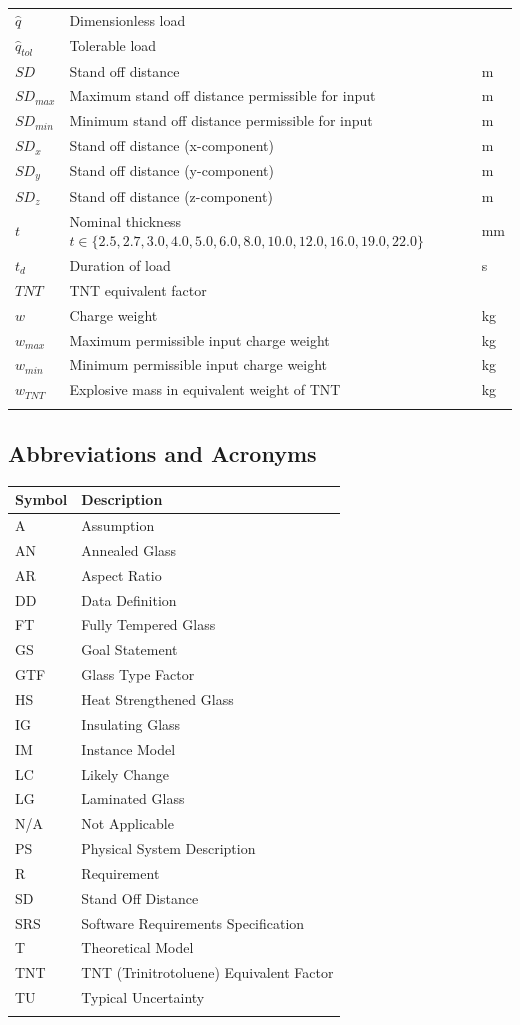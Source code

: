 \documentclass[12pt]{article}
\begin{document}
\begin{longtabu}{l X[l] l}
\\
$\hat{q}$ & Dimensionless load & 
\\
${\hat{q}_{tol}}$ & Tolerable load & 
\\
$SD$ & Stand off distance & m
\\
${SD_{max}}$ & Maximum stand off distance permissible for input & m
\\
${SD_{min}}$ & Minimum stand off distance permissible for input & m
\\
${SD_{x}}$ & Stand off distance (x-component) & m
\\
${SD_{y}}$ & Stand off distance (y-component) & m
\\
${SD_{z}}$ & Stand off distance (z-component) & m
\\
$t$ & Nominal thickness $t\in{}\{2.5,2.7,3.0,4.0,5.0,6.0,8.0,10.0,12.0,16.0,19.0,22.0\}$ & mm
\\
${t_{d}}$ & Duration of load & s
\\
$TNT$ & TNT equivalent factor & 
\\
$w$ & Charge weight & kg
\\
${w_{max}}$ & Maximum permissible input charge weight & kg
\\
${w_{min}}$ & Minimum permissible input charge weight & kg
\\
${w_{TNT}}$ & Explosive mass in equivalent weight of TNT & kg
\\
\bottomrule
\label{Table:ToS}
\end{longtabu}
\subsection{Abbreviations and Acronyms}
\label{Sec:TAbbAcc}
\begin{longtable*}{l l}
\toprule
Symbol & Description
\\
\midrule
A & Assumption
\\
AN & Annealed Glass
\\
AR & Aspect Ratio
\\
DD & Data Definition
\\
FT & Fully Tempered Glass
\\
GS & Goal Statement
\\
GTF & Glass Type Factor
\\
HS & Heat Strengthened Glass
\\
IG & Insulating Glass
\\
IM & Instance Model
\\
LC & Likely Change
\\
LG & Laminated Glass
\\
N/A & Not Applicable
\\
PS & Physical System Description
\\
R & Requirement
\\
SD & Stand Off Distance
\\
SRS & Software Requirements Specification
\\
T & Theoretical Model
\\
TNT & TNT (Trinitrotoluene) Equivalent Factor
\\
TU & Typical Uncertainty
\\
\bottomrule
\label{Table:TAbbAcc}
\end{longtable*}
\end{document}
